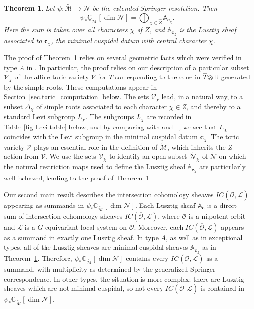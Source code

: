 \documentclass[reqno,11pt]{amsart}
\newtheorem{Thm}{Theorem}[section]
\theoremstyle{remark}
\theoremstyle{remark}
\theoremstyle{definition}
\theoremstyle{definition}
\theoremstyle{definition}
\numberwithin{equation}{section}
\newcommand{\A}{\mathbb{ A}}
\newcommand{\R}{\mathbb{ R}}           %
\newcommand{\C}{\mathbb{C}}           %
\newcommand{\cl}{\mathcal{L}}
\newcommand{\cm}{\mathcal{M}}
\newcommand{\cn}{\mathcal{N}}
\newcommand{\co}{\mathcal{O}}
\newcommand{\toric}{\mathcal{V}}
\newcommand{\vc}{\mathbf{c}}
\newcommand{\shc}{\underline{\C}}
\renewcommand{\tilde}{\widetilde}
\renewcommand{\hat}{\widehat}
\begin{document}
\begin{Thm} \label{t:main1} Let $\psi: \tilde{\cm} \to \cn$ be the extended Springer resolution.  Then 
\[
\psi_* \shc_{\tilde{\cm}}[\dim \cn] = \bigoplus_{\chi \in \hat{Z}} \A_{\vc_{\chi}}.
\]
Here the sum is taken over all characters $\chi$ of $Z$, and $\A_{\vc_{\chi}}$ is the Lusztig sheaf associated to $\vc_{\chi}$, the minimal cuspidal datum with central character $\chi$.
\end{Thm}


The proof of Theorem~\ref{t:main1} relies on several geometric facts which were verified in type $A$ in \cite{GPR23}.  
In particular, the proof relies on our description of a particular subset $\toric_{\chi}$ of the affine toric variety $\toric$ for $T$ corresponding to the cone in $\hat{T}\otimes \R$ generated by the simple roots. These computations appear in Section~\ref{sec.toric_computation} below.  The sets $\toric_{\chi}$ lead, in a natural way, to a subset $\Delta_\chi$ of simple roots associated to each character $\chi\in Z$, and thereby to a standard Levi subgroup $L_{\chi}$.  The subgroups $L_{\chi}$ are recorded in Table~\ref{fig.Levi.table} below, and by comparing with \cite[Prop.~5.1]{AHJR3} and ~\cite[Table 2.17]{Bonnafe2004},
we see that $L_{\chi}$ coincides with the Levi subgroup in the minimal cuspidal datum $\vc_{\chi}$.  
The toric variety $\toric$ plays an essential role in the definition of $\tilde{\cm}$, which inherits the $Z$-action from $\toric$. We use the sets $\toric_\chi$ to identify an open subset $\tilde{\cn}_\chi$ of $\tilde{\cn}$ on which the natural restriction maps used to define the Lusztig sheaf $\A_{\vc_{\chi}}$ are particularly well-behaved, leading to the proof of Theorem~\ref{t:main1}. 

Our second main result describes the intersection cohomology sheaves $IC(\overline{\co}, \cl)$ appearing as summands in $\psi_* \shc_{\tilde{\cm}}[\dim \cn] $.  
Each Lusztig sheaf $\A_\vc$ is a direct sum of intersection cohomology sheaves $IC(\overline{\co}, \cl)$, where 
$\co$ is a nilpotent orbit and $\cl$ is a $G$-equivariant local system on $\co$.  
Moreover, each $IC(\overline{\co}, \cl)$ appears as a summand in exactly one Lusztig sheaf.  In type $A$, as well as in exceptional types, all of the Lusztig sheaves are minimal
cuspidal sheaves $\A_{\vc_{\chi}}$ as in Theorem~\ref{t:main1}.  Therefore,  $\psi_* \shc_{\tilde{\cm}}[\dim \cn] $ contains every $IC(\overline{\co}, \cl)$ as a summand, 
with multiplicity as determined by the generalized Springer correspondence.  In other types, the situation is more complex:  there are Lusztig sheaves which are not minimal cuspidal, so
not every $IC(\overline{\co}, \cl)$ is contained in $\psi_* \shc_{\tilde{\cm}}[\dim \cn] $.  
\end{document}
